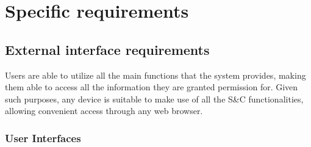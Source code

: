 \chapter{Specific requirements}

\section{External interface requirements}

Users are able to utilize all the main functions that the system provides, making them able to access all the information they are granted permission for.
Given such purposes, any device is suitable to make use of all the S\&C functionalities, allowing convenient access through any web browser.

\subsection{User Interfaces}

